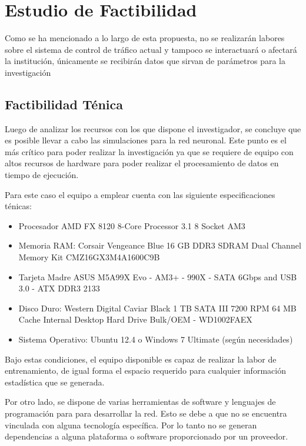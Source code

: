 \chapter{Estudio de Factibilidad}
	\label{chap:fact}
	
	Como se ha mencionado a lo largo de esta propuesta, no se realizar\'{a}n
labores sobre el sistema de control de  tr\'{a}fico actual y tampoco se
interactuar\'{a} o afectar\'{a} la instituci\'{o}n, \'{u}nicamente
se recibir\'{a}n datos que sirvan de par\'{a}metros para la investigaci\'{o}n
	
	\section{Factibilidad T\'{e}nica}
	
	Luego de analizar los recursos con los que dispone el investigador, se concluye
que es posible llevar a cabo las simulaciones para la red neuronal. Este punto
es el m\'{a}s cr\'{i}tico para poder realizar la investigaci\'{o}n ya que se
requiere de equipo con altos recursos de hardware para poder realizar el
procesamiento de datos en tiempo de ejecuci\'{o}n.
	
	Para este caso el equipo a emplear cuenta con las siguiente especificaciones
	t\'{e}nicas:
	\begin{itemize}
	  \item Procesador AMD FX 8120 8-Core Processor 3.1 8 Socket AM3
	  \item Memoria RAM: Corsair Vengeance Blue 16 GB DDR3 SDRAM Dual Channel
	  Memory Kit CMZ16GX3M4A1600C9B
	  \item Tarjeta Madre ASUS M5A99X Evo - AM3+ - 990X - SATA 6Gbps and USB 3.0 -
	  ATX DDR3 2133
	  \item Disco Duro: Western Digital Caviar Black 1 TB SATA III 7200 RPM 64 MB
	  Cache Internal Desktop Hard Drive Bulk/OEM - WD1002FAEX
	  \item Sistema Operativo: Ubuntu 12.4 o Windows 7 Ultimate (seg\'{u}n
	  necesidades)
	  
	\end{itemize}
	
	Bajo estas condiciones, el equipo disponible es capaz de realizar la labor de
entrenamiento, de igual forma el espacio requerido para cualquier
informaci\'{o}n estad\'{i}stica que se generada. 

	Por otro lado, se dispone de varias herramientas de software y lenguajes de
programaci\'{o}n para para desarrollar la red. Esto se debe a que no se
encuentra vinculada con alguna tecnolog\'{i}a espec\'{i}fica. Por lo tanto no
se generan dependencias a alguna plataforma o software proporcionado por un
proveedor.
	
